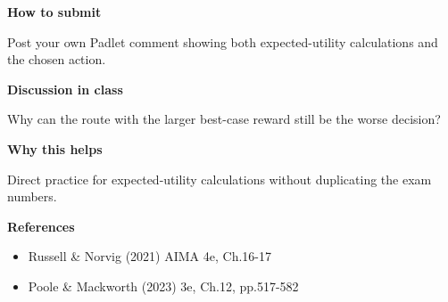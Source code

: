 \documentclass[11pt]{article}
\begin{document}
\begin{tcolorbox}[colback=white,colframe=MidnightBlue,title={Q2 Structured Problem},fonttitle=\bfseries,breakable]
{\large\bfseries\color{MidnightBlue} How to submit}\par\medskip
Post your own Padlet comment showing both expected-utility calculations and the chosen action.

{\large\bfseries\color{MidnightBlue} Discussion in class}\par\medskip
Why can the route with the larger best-case reward still be the worse decision?

{\large\bfseries\color{MidnightBlue} Why this helps}\par\medskip
Direct practice for expected-utility calculations without duplicating the exam numbers.

{\large\bfseries\color{MidnightBlue} References}\par\medskip
\begin{itemize}\item Russell \& Norvig (2021) AIMA 4e, Ch.16-17
\item Poole \& Mackworth (2023) 3e, Ch.12, pp.517-582\end{itemize}
\end{tcolorbox}
\end{document}
